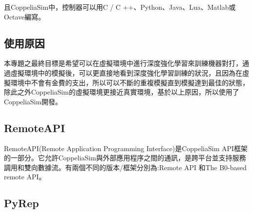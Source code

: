 \documentclass[14pt,a4paper]{report}  %
\begin{document}
且CoppeliaSim中，控制器可以用C / C ++、Python、Java、Lua、Matlab或Octave編寫。\\
\subsection{使用原因}
 本專題之最終目標是希望可以在虛擬環境中進行深度強化學習來訓練機器對打，通過虛擬環境中的模擬後，可以更直接地看到深度強化學習訓練的狀況，且因為在虛擬環境中不會有金費的支出，所以可以不斷的重複模擬直到模擬達到最佳的狀態，除此之外CoppeliaSim的虛擬環境更接近真實環境，基於以上原因，所以使用了CoppeliaSim開發。\\
\subsection{RemoteAPI}
 RemoteAPI(Remote Application Programming Interface)是CoppeliaSim API框架的一部分。它允許CoppeliaSim與外部應用程序之間的通訊，是跨平台並支持服務調用和雙向數據流。有兩個不同的版本/框架分別為:Remote API 和The B0-based remote API。\\
\subsection{PyRep}
\end{document}
